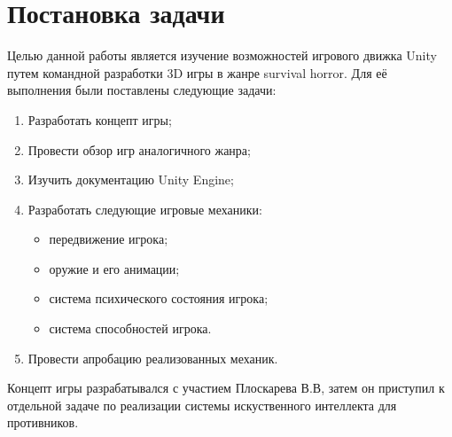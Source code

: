 
\section{Постановка задачи}
\label{sec:task}
Целью данной работы является изучение возможностей игрового движка Unity путем командной разработки 3D игры в жанре survival horror. Для её выполнения были поставлены следующие задачи:

 \begin{enumerate}
 \item  Разработать концепт игры;
 \item  Провести обзор игр аналогичного жанра;
 \item  Изучить документацию Unity Engine;
 \item  Разработать следующие игровые механики:
   \begin{itemize}
   \item  передвижение игрока;
   \item  оружие и его анимации;
   \item  система психического состояния игрока;
   \item  система способностей игрока.
   \end{itemize}
 \item  Провести апробацию реализованных механик.
 \end{enumerate}

 Концепт игры разрабатывался с участием Плоскарева В.В, затем он приступил к отдельной задаче по реализации системы искуственного интеллекта для противников.
